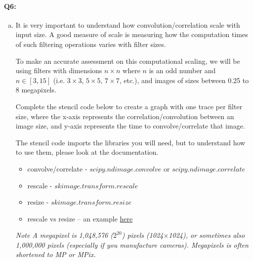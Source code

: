 
\pagebreak
\paragraph{Q6:}
\begin{enumerate}[(a)]
    \item
    It is very important to understand how convolution/correlation scale with input size. A good measure of scale is measuring how the computation times of such filtering operations varies with filter sizes.
    
    To make an accurate assessment on this computational scaling, we will be using filters with dimensions $n \times n$ where $n$ is an odd number and $n \in [3, 15]$ (i.e. $3\times3$, $5\times5$, $7\times7$, etc.), and images of sizes between 0.25 to 8 megapixels.
    
    Complete the stencil code below to create a graph with one trace per filter size, where the x-axis represents the correlation/convolution between an image size, and y-axis represents the time to convolve/correlate that image.

    The stencil code imports the libraries you will need, but to understand how to use them, please look at the documentation.
    \begin{itemize}
    \item convolve/correlate - \href{https://docs.scipy.org/doc/scipy/reference/generated/scipy.ndimage.convolve.html}{$scipy.ndimage.convolve$} or \href{https://docs.scipy.org/doc/scipy/reference/generated/scipy.ndimage.correlate.html}{$scipy.ndimage.correlate$}
    \item rescale - \href{https://scikit-image.org/docs/dev/api/skimage.transform.html#skimage.transform.rescale}{$skimage.transform.rescale$}
    \item resize - \href{https://scikit-image.org/docs/dev/api/skimage.transform.html#skimage.transform.resize}{$skimage.transform.resize$}
    \item rescale vs resize – an example \href{http://scikit-image.org/docs/dev/auto_examples/transform/plot_rescale.html}{here}
    \end{itemize}

\emph{Note A megapixel is 1,048,576 ($2^{20}$) pixels (1024$\times$1024), or sometimes also 1,000,000 pixels (especially if you manufacture cameras). Megapixels is often shortened to MP or MPix.}


\end{enumerate}
